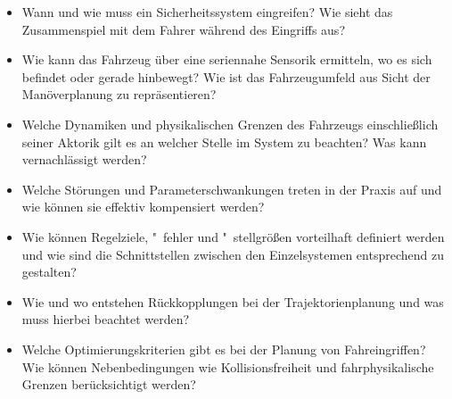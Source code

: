 \begin{itemize}
\item Wann und wie muss ein Sicherheitssystem eingreifen? %
Wie sieht das Zusammenspiel mit dem Fahrer während des Eingriffs aus? %
\item Wie kann das Fahrzeug über eine seriennahe Sensorik ermitteln, wo es sich befindet oder gerade hinbewegt? Wie ist das Fahrzeugumfeld aus Sicht der Manöverplanung zu repräsentieren? %
%
\item Welche Dynamiken und physikalischen Grenzen des Fahrzeugs einschließlich seiner Aktorik gilt es an welcher Stelle im System zu beachten? Was kann vernachlässigt werden?
\item Welche Störungen und Parameterschwankungen treten in der Praxis auf und wie können sie effektiv kompensiert werden?
%
\item Wie können Regelziele, "~fehler und "~stellgrößen vorteilhaft definiert werden und wie sind die Schnittstellen zwischen den Einzelsystemen entsprechend zu gestalten?
\item Wie und wo entstehen Rückkopplungen bei der Trajektorienplanung und was muss hierbei beachtet werden?
\item Welche Optimierungskriterien gibt es bei der Planung von Fahreingriffen? Wie können Nebenbedingungen wie Kollisionsfreiheit und fahrphysikalische Grenzen berücksichtigt werden?
\end{itemize}

